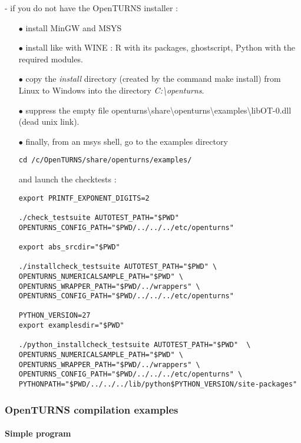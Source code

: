 - if you do not have the OpenTURNS installer :

\begin{itemize}
\item[$\bullet$]   install MinGW and MSYS
\item[$\bullet$]   install like with WINE : R with its packages, ghostscript, Python with the required modules.

\item[$\bullet$]   copy the \emph{install} directory (created by the command make install) from Linux to Windows into the directory \emph{C:\textbackslash openturns}.
\item[$\bullet$]   suppress the empty file openturns\textbackslash share\textbackslash openturns\textbackslash examples\textbackslash libOT-0.dll
(dead unix link).

\item[$\bullet$]   finally, from an msys shell, go to the examples directory

\begin{verbatim}
cd /c/OpenTURNS/share/openturns/examples/
\end{verbatim}

and launch the checktests :
\begin{verbatim}
export PRINTF_EXPONENT_DIGITS=2

./check_testsuite AUTOTEST_PATH="$PWD" OPENTURNS_CONFIG_PATH="$PWD/../../../etc/openturns"

export abs_srcdir="$PWD"

./installcheck_testsuite AUTOTEST_PATH="$PWD" \
OPENTURNS_NUMERICALSAMPLE_PATH="$PWD" \
OPENTURNS_WRAPPER_PATH="$PWD/../wrappers" \
OPENTURNS_CONFIG_PATH="$PWD/../../../etc/openturns"

PYTHON_VERSION=27
export examplesdir="$PWD"

./python_installcheck_testsuite AUTOTEST_PATH="$PWD"  \
OPENTURNS_NUMERICALSAMPLE_PATH="$PWD" \
OPENTURNS_WRAPPER_PATH="$PWD/../wrappers" \
OPENTURNS_CONFIG_PATH="$PWD/../../../etc/openturns" \
PYTHONPATH="$PWD/../../../lib/python$PYTHON_VERSION/site-packages"
\end{verbatim}
\end{itemize}


\subsubsection{OpenTURNS compilation examples}


\paragraph{Simple program\label{simple-program}}

